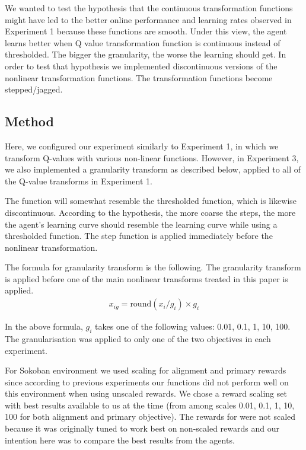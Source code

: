 

We wanted to test the hypothesis that the continuous transformation functions might have led to the better online performance and learning rates observed in Experiment 1 because these functions are smooth. Under this view, the agent learns better when Q value transformation function is continuous instead of thresholded. The bigger the granularity, the worse the learning should get. In order to test that hypothesis we implemented discontinuous versions of the nonlinear transformation functions. The transformation functions become stepped/jagged.

\subsection{Method}

Here, we configured our experiment similarly to Experiment 1, in which we transform Q-values with various non-linear functions. However, in Experiment 3, we also implemented a granularity transform as described below, applied to all of the Q-value transforms in Experiment 1.

The function will somewhat resemble the thresholded function, which is likewise discontinuous. According to the hypothesis, the more coarse the steps, the more the agent's learning curve should resemble the learning curve while using a thresholded function. The step function is applied immediately before the nonlinear transformation. 

The formula for granularity transform is the following. The granularity transform is applied before one of the main nonlinear transforms treated in this paper is applied.
\begin{align}
x_{ig} = \text{round}(x_i / g_i) \times g_i
\end{align}

In the above formula, $g_i$ takes one of the following values: 0.01, 0.1, 1, 10, 100. The granularisation was applied to only one of the two objectives in each experiment. 


For Sokoban environment we used scaling for alignment and primary rewards since according to previous experiments our functions did not perform well on this environment when using unscaled rewards. We chose a reward scaling set with best results available to us at the time (from among scales 0.01, 0.1, 1, 10, 100 for both alignment and primary objective). The rewards for \tloA{} were not scaled because it was originally tuned to work best on non-scaled rewards and our intention here was to compare the best results from the agents.






